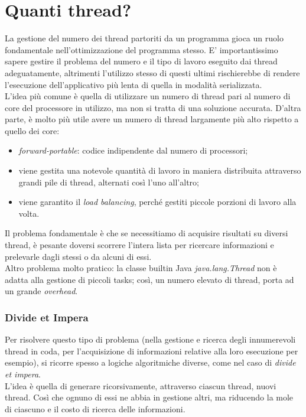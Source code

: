 \section{Quanti thread?}
La gestione del numero dei thread partoriti da un programma gioca un ruolo fondamentale nell'ottimizzazione del programma stesso. E' importantissimo sapere gestire il problema del numero e il tipo di lavoro eseguito dai thread adeguatamente, altrimenti l'utilizzo stesso di questi ultimi rischierebbe di rendere l'esecuzione dell'applicativo più lenta di quella in modalità serializzata. \\
L'idea più comune è quella di utilizzare un numero di thread pari al numero di core del processore in utilizzo, ma non si tratta di una soluzione accurata. D'altra parte, è molto più utile avere un numero di thread largamente più alto rispetto a quello dei core:
\begin{itemize}
	\item \textit{forward-portable}: codice indipendente dal numero di processori;
	\item viene gestita una notevole quantità di lavoro in maniera distribuita attraverso grandi pile di thread, alternati così l'uno all'altro;
	\item viene garantito il \textit{load balancing}, perché gestiti piccole porzioni di lavoro alla volta.
\end{itemize}
Il problema fondamentale è che se necessitiamo di acquisire risultati su diversi thread, è pesante doversi scorrere l'intera lista per ricercare informazioni e prelevarle dagli stessi o da alcuni di essi. \\
Altro problema molto pratico: la classe builtin Java \textit{java.lang.Thread} non è adatta alla gestione di piccoli tasks; così, un numero elevato di thread, porta ad un grande \textit{overhead}.

\subsubsection{Divide et Impera}
Per risolvere questo tipo di problema (nella gestione e ricerca degli innumerevoli thread in coda, per l'acquisizione di informazioni relative alla loro esecuzione per esempio), si ricorre spesso a logiche algoritmiche diverse, come nel caso di \textit{divide et impera}. \\
L'idea è quella di generare ricorsivamente, attraverso ciascun thread, nuovi thread. Così che ognuno di essi ne abbia in gestione altri, ma riducendo la mole di ciascuno e il costo di ricerca delle informazioni.